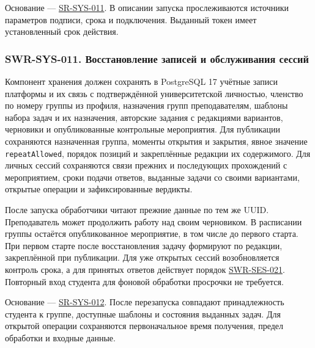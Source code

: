 \documentclass[12pt,a4paper]{article}
\begin{document}
Основание --- {\href{../04\_Системные\_требования/DOC-05\_Системные\_требования.pdf\#sr-sys-011}{SR-SYS-011}}. В описании запуска прослеживаются источники параметров подписи, срока и подключения. Выданный токен имеет установленный срок действия.

\subsubsection{SWR-SYS-011. Восстановление записей и обслуживания сессий}\label{swr-sys-011-ux432ux43eux441ux441ux442ux430ux43dux43eux432ux43bux435ux43dux438ux435-ux437ux430ux43fux438ux441ux435ux439-ux438-ux43eux431ux441ux43bux443ux436ux438ux432ux430ux43dux438ux44f-ux441ux435ux441ux441ux438ux439}

\hypertarget{swr-sys-011-восстановление-записей-и-обслуживания-сессий}{}

\hypertarget{swr-sys-011}{}

Компонент хранения должен сохранять в PostgreSQL 17 учётные записи платформы и их связь с подтверждённой университетской личностью, членство по номеру группы из профиля, назначения групп преподавателям, шаблоны набора задач и их назначения, авторские задания с редакциями вариантов, черновики и опубликованные контрольные мероприятия. Для публикации сохраняются назначенная группа, моменты открытия и закрытия, явное значение \texttt{repeat\allowbreak{}Allowed}, порядок позиций и закреплённые редакции их содержимого. Для личных сессий сохраняются связи прежних и последующих прохождений с мероприятием, сроки подачи ответов, выданные задачи со своими вариантами, открытые операции и зафиксированные вердикты.

После запуска обработчики читают прежние данные по тем же UUID. Преподаватель может продолжить работу над своим черновиком. В расписании группы остаётся опубликованное мероприятие, в том числе до первого старта. При первом старте после восстановления задачу формируют по редакции, закреплённой при публикации. Для уже открытых сессий возобновляется контроль срока, а для принятых ответов действует порядок {\href{DOC-06.2\_Сессии\_задач\_и\_планировщик.pdf\#swr-ses-021}{SWR-SES-021}}. Повторный вход студента для фоновой обработки просрочки не требуется.

Основание --- {\href{../04\_Системные\_требования/DOC-05\_Системные\_требования.pdf\#sr-sys-012}{SR-SYS-012}}. После перезапуска совпадают принадлежность студента к группе, доступные шаблоны и состояния выданных задач. Для открытой операции сохраняются первоначальное время получения, предел обработки и входные данные.
\end{document}
